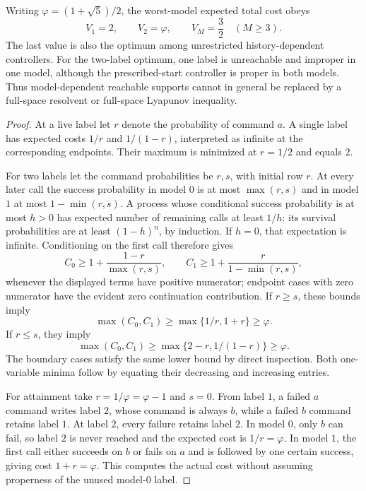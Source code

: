 \begin{proposition}
\label{prop:r79-golden-ratio-memory}
Writing $\varphi=(1+\sqrt5)/2$, the worst-model expected total cost obeys
\[
 V_1=2,\qquad V_2=\varphi,\qquad V_M=\frac32\quad(M\ge3).
\]
The last value is also the optimum among unrestricted history-dependent
controllers.  For the two-label optimum, one label is unreachable and
improper in one model, although the prescribed-start controller is proper
in both models.  Thus model-dependent reachable supports cannot in
general be replaced by a full-space resolvent or full-space Lyapunov
inequality.
\end{proposition}
\begin{proof}
At a live label let $r$ denote the probability of command $a$.  A single
label has expected costs $1/r$ and $1/(1-r)$, interpreted as infinite at
the corresponding endpoints.  Their maximum is minimized at $r=1/2$
and equals $2$.

For two labels let the command probabilities be $r,s$, with initial row
$r$.  At every later call the success probability in model $0$ is at most
$\max(r,s)$ and in model $1$ at most $1-\min(r,s)$.  A process whose
conditional success probability is at most $h>0$ has expected number of
remaining calls at least $1/h$: its survival probabilities are at least
$(1-h)^n$, by induction.  If $h=0$, that expectation is infinite.
Conditioning on the first call therefore gives
\[
 C_0\ge1+\frac{1-r}{\max(r,s)},\qquad
 C_1\ge1+\frac{r}{1-\min(r,s)},
\]
whenever the displayed terms have positive numerator; endpoint cases
with zero numerator have the evident zero continuation contribution.
If $r\ge s$, these bounds imply
\[
 \max(C_0,C_1)\ge\max\{1/r,1+r\}\ge\varphi.
\]
If $r\le s$, they imply
\[
 \max(C_0,C_1)\ge\max\{2-r,1/(1-r)\}\ge\varphi.
\]
The boundary cases satisfy the same lower bound by direct inspection.
Both one-variable minima follow by equating their decreasing and
increasing entries.

For attainment take $r=1/\varphi=\varphi-1$ and $s=0$.  From label $1$,
a failed $a$ command writes label $2$, whose command is always $b$,
while a failed $b$ command retains label $1$.  At label $2$, every
failure retains label $2$.  In model $0$, only $b$ can fail, so label
$2$ is never reached and the expected cost is $1/r=\varphi$.  In model
$1$, the first call either succeeds on $b$ or fails on $a$ and is followed
by one certain success, giving cost $1+r=\varphi$.  This computes the
actual cost without assuming properness of the unused model-$0$ label.


\end{proof}
